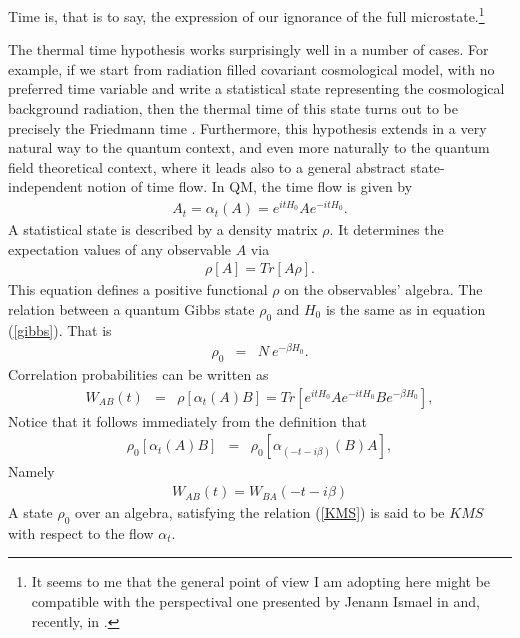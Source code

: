\documentclass[10pt,nofootinbib]{revtex4}
\begin{document}
Time is, that is to say, the expression of our ignorance of the full 
microstate.\footnote{It seems to me that the general point of view
I am adopting here might be compatible with the perspectival one
presented by Jenann Ismael in \cite{J} and, recently, in 
\cite{J2}.}

The thermal time hypothesis works surprisingly well in a number of
cases.  For example, if we start from radiation filled covariant
cosmological model, with no preferred time variable and write a
statistical state representing the cosmological background radiation,
then the thermal time of this state turns out to be precisely the
Friedmann time \cite{RovelliThermalTime2}.  Furthermore, 
this hypothesis extends in a very 
natural way to the quantum context, and even more naturally to the
quantum field theoretical context, where it leads also to a general
abstract state-independent notion of time flow.
In QM, the time flow is
given by
\begin{eqnarray}
A_{t}= \alpha_{t}(A) = e^{it H_{0}}A e^{-it H_{0}} .
\label{timeflowQ} 
\end{eqnarray} 
A statistical state  is described by a
density matrix $\rho$.  It determines the expectation values of any
observable $A$ via
\begin{eqnarray}
\rho[A] =  Tr[A\rho].
\end{eqnarray} 
This equation defines a positive functional $\rho$ on the observables'
algebra. The relation between a quantum
Gibbs state $\rho_{0}$ and $H_{0}$ is the same as in equation
(\ref{gibbs}).  That is
\begin{eqnarray}
\rho_{0}& = & N\ e^{-\beta H_{0}}. 
\label{rhoHzeroQ}
\end{eqnarray}
Correlation probabilities can be written as
\begin{eqnarray}
W_{AB}(t)& = & \rho[\alpha_{t}(A)B] = Tr[e^{it H_{0}}A e^{-it H_{0}} B
e^{-\beta H_{0}}], 
\label{ABtQ}
\end{eqnarray}
Notice that it follows immediately from the definition that  
\begin{eqnarray} 
\rho_{0}[\alpha_{t}(A)B]& = & \rho_{0}[\alpha_{(-t-i\beta)}(B)A], 
\label{KMS}
\end{eqnarray}
Namely 
\begin{eqnarray} 
W_{AB}(t) = W_{BA}(-t-i\beta)
\label{KMS2}
\end{eqnarray}
A state $\rho_{0}$ over an algebra, satisfying the relation
(\ref{KMS}) is said to be $KMS$ with respect to the flow $\alpha_{t}$.
\end{document}
